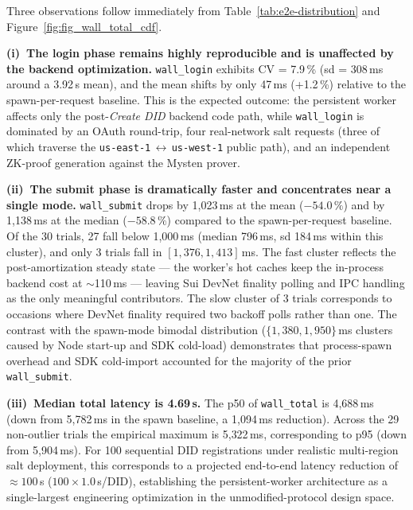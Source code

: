 Three observations follow immediately from
Table~\ref{tab:e2e-distribution} and Figure~\ref{fig:fig_wall_total_cdf}.

\textbf{(i)~The login phase remains highly reproducible and is unaffected
by the backend optimization.}
\texttt{wall\_login} exhibits CV = 7.9\,\% (sd = 308\,ms around a 3.92\,s
mean), and the mean shifts by only 47\,ms (+1.2\,\%) relative to the
spawn-per-request baseline. This is the expected outcome: the
persistent worker affects only the post-\emph{Create DID} backend code
path, while \texttt{wall\_login} is dominated by an OAuth round-trip,
four real-network salt requests (three of which traverse the
\texttt{us-east-1}\,$\leftrightarrow$\,\texttt{us-west-1} public path),
and an independent ZK-proof generation against the Mysten prover.

\textbf{(ii)~The submit phase is dramatically faster and concentrates
near a single mode.}
\texttt{wall\_submit} drops by 1{,}023\,ms at the mean (\(-54.0\,\%\))
and by 1{,}138\,ms at the median (\(-58.8\,\%\)) compared to the
spawn-per-request baseline. Of the 30 trials, 27 fall below 1{,}000\,ms
(median 796\,ms, sd 184\,ms within this cluster), and only 3 trials
fall in $[1{,}376, 1{,}413]$\,ms. The fast cluster reflects the
post-amortization steady state — the worker's hot caches keep the
in-process backend cost at $\sim$110\,ms — leaving Sui DevNet finality
polling and IPC handling as the only meaningful contributors. The
slow cluster of 3 trials corresponds to occasions where DevNet
finality required two backoff polls rather than one. The contrast
with the spawn-mode bimodal distribution
($\{1{,}380, 1{,}950\}$\,ms clusters caused by Node start-up and SDK
cold-load) demonstrates that process-spawn overhead and SDK
cold-import accounted for the majority of the prior \texttt{wall\_submit}.

\textbf{(iii)~Median total latency is 4.69\,s.}
The p50 of \texttt{wall\_total} is 4{,}688\,ms (down from 5{,}782\,ms
in the spawn baseline, a 1{,}094\,ms reduction). Across the 29
non-outlier trials the empirical maximum is 5{,}322\,ms, corresponding
to p95 (down from 5{,}904\,ms). For 100 sequential DID registrations
under realistic multi-region salt deployment, this corresponds to a
projected end-to-end latency reduction of $\approx 100$\,s
(\(100 \times 1.0\)\,s/DID), establishing the persistent-worker
architecture as a single-largest engineering optimization in the
unmodified-protocol design space.
